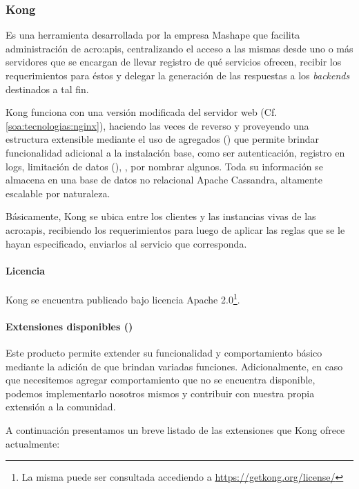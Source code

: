 \subsubsection{Kong}
\label{soa:tecnologias:kong}

Es una herramienta desarrollada por la empresa Mashape que facilita administración de \glspl{acro:api}, centralizando el acceso a las mismas desde uno o más servidores que se encargan de llevar registro de qué servicios ofrecen, recibir los requerimientos para éstos y delegar la generación de las respuestas a los \textit{backends} destinados a tal fin.

Kong funciona con una versión modificada del servidor web  (Cf. \autoref{soa:tecnologias:nginx}), haciendo las veces de  reverso y proveyendo una estructura extensible mediante el uso de agregados () que permite brindar funcionalidad adicional a la instalación base, como ser autenticación, registro en logs, limitación de datos (), , por nombrar algunos. Toda su información se almacena en una base de datos no relacional Apache Cassandra, altamente escalable por naturaleza.

Básicamente, Kong se ubica entre los clientes y las instancias vivas de las \glspl{acro:api}, recibiendo los requerimientos para luego de aplicar las reglas que se le hayan especificado, enviarlos al servicio que corresponda.

\paragraph{Licencia}

Kong se encuentra publicado bajo licencia Apache 2.0\footnote{La misma puede ser consultada accediendo a \url{https://getkong.org/license/}}.

\paragraph{Extensiones disponibles ()}

Este producto permite extender su funcionalidad y comportamiento básico mediante la adición de  que brindan variadas funciones. Adicionalmente, en caso que necesitemos agregar comportamiento que no se encuentra disponible, podemos implementarlo nosotros mismos y contribuir con nuestra propia extensión a la comunidad.

A continuación presentamos un breve listado de las extensiones que Kong ofrece actualmente:

